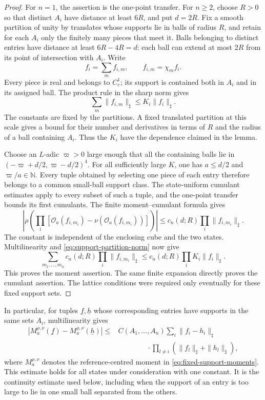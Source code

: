 \documentclass[11pt,letterpaper,reqno]{amsart}
\theoremstyle{definition}
\theoremstyle{remark}
\newcommand{\cO}{\mathcal O}
\begin{document}
\begin{proof}
For \(n=1\), the assertion is the one-point transfer.
For \(n\ge2\), choose \(R>0\) so that distinct \(A_i\)
have distance at least \(6R\), and put \(d=2R\).
Fix a smooth partition of unity by translates whose
supports lie in balls of radius \(R\), and retain for
each \(A_i\) only the finitely many pieces that meet it.
Balls belonging to distinct entries have distance at
least \(6R-4R=d\): each ball can extend at most
\(2R\) from its point of intersection with \(A_i\).
Write
\[
 f_i=\sum_m f_{i,m},\qquad f_{i,m}=\chi_mf_i.
\]
Every piece is real and belongs to \(C_c^1\); its support
is contained both in \(A_i\) and in its assigned ball.
The product rule in the sharp norm gives
\begin{equation}\label{eq:support-partition-norm}
 \sum_m\|f_{i,m}\|_\sharp\le K_i\|f_i\|_\sharp.
\end{equation}
The constants are fixed by the partitions. A fixed translated
partition at this scale gives a bound for their number and
derivatives in terms of \(R\) and the radius of a ball
containing \(A_i\). Thus the \(K_i\) have the dependence
claimed in the lemma.

Choose an \(L\)-adic \(\varpi>0\) large enough that all the
containing balls lie in
\((-\varpi+d/2,\varpi-d/2)^4\). For all sufficiently large
\(K\), one has \(a\le d/2\) and \(\varpi/a\in\mathbb N\).
Every tuple obtained by selecting one piece of each entry
therefore belongs to a common small-ball support class.
The state-uniform cumulant estimates apply to every subset
of such a tuple, and the one-point transfer bounds its
first cumulants. The finite moment--cumulant formula gives
\[
 \left|\rho\left(\prod_i
 [\cO_a(f_{i,m_i})-\nu(\cO_a(f_{i,m_i}))]\right)\right|
       \le c_n(d;R)\prod_i\|f_{i,m_i}\|_\sharp .
\]
The constant is independent of the enclosing cube and
the two states. Multilinearity and
\eqref{eq:support-partition-norm} now give
\[
 \sum_{m_1,\ldots,m_n}
           c_n(d;R)\prod_i\|f_{i,m_i}\|_\sharp
 \le c_n(d;R)\prod_iK_i\|f_i\|_\sharp .
\]
This proves the moment assertion. The same finite expansion
directly proves the cumulant assertion. The lattice
conditions were required only eventually for these fixed
support sets.
\end{proof}

In particular, for tuples \(\underline f,\underline h\)
whose corresponding entries have supports in the same
sets \(A_i\), multilinearity gives
\begin{equation}\label{eq:fixed-support-continuity}
 \begin{split}
 |M_a^{\rho,\nu}(\underline f)-M_a^{\rho,\nu}(\underline h)|
 \le{}&C(A_1,\ldots,A_n)\sum_i\|f_i-h_i\|_\sharp\\
 &\qquad\qquad\cdot
        \prod_{l\ne i}(\|f_l\|_\sharp+\|h_l\|_\sharp),
 \end{split}
\end{equation}
where \(M_a^{\rho,\nu}\) denotes the reference-centred
moment in \eqref{eq:fixed-support-moments}. This estimate
holds for all states under consideration with one constant.
It is the continuity estimate used below, including when
the support of an entry is too large to lie in one
small ball separated from the others.
\end{document}
